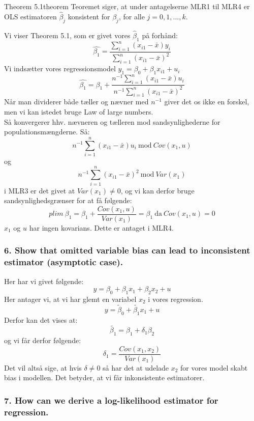 \documentclass[
  10pt,
]{article}
\begin{document}
\leavevmode
\begin{mytheo}{Theorem 5.1}{theorem}
 Teoremet siger, at under antagelserne MLR1 til MLR4 er OLS estimatoren $\hat\beta_j$ konsistent for $\beta_j$, for alle $j=0,1,...,k$.
\end{mytheo}

Vi viser Theorem 5.1, som er givet vores \(\hat\beta_1\) på forhånd:
\[\hat{\beta_1}= \frac{\sum\limits_{i=1}^n(x_{i1}-\bar{x})y_i}{\sum\limits_{i=1}^n(x_{i1}-\bar{x})^2}\]
Vi indsætter vores regressionsmodel \(y_1=\beta_0+\beta_1x_{i1}+u_i\)
\[\hat{\beta_1}= \beta_1+\frac{n^{-1}\sum\limits_{i=1}^n(x_{i1}-\bar{x})u_i}{n^{-1}\sum\limits_{i=1}^n(x_{i1}-\bar{x})^2}\]
Når man dividerer både tæller og nævner med \(n^{-1}\) giver det os ikke
en forskel, men vi kan istedet bruge Law of large numbers.\\
Så konvergerer hhv. nævneren og tælleren mod sandsynlighederne for
populationsmængderne. Så:
\[ n^{-1}\sum\limits_{i=1}^n(x_{i1}-\bar{x})u_i\ \text{mod}\ Cov(x_1,u)\]
og
\[n^{-1}\sum\limits_{i=1}^n(x_{i1}-\bar{x})^2\ \text{mod}\ Var(x_1) \] i
MLR3 er det givet at \(Var(x_1)\neq0\), og vi kan derfor bruge
sandsynlighedsgrænser for at få følgende:
\[ plim\ \beta_1 =\beta_1+\frac{Cov(x_1,u)}{Var(x_1)} = \beta_1\ \text{da}\ Cov(x_1,u)=0\]
\(x_1\) og \(u\) har ingen kovarians. Dette er antaget i MLR4. \newpage

\hypertarget{show-that-omitted-variable-bias-can-lead-to-inconsistent-estimator-asymptotic-case.}{%
\subsubsection{6. Show that omitted variable bias can lead to
inconsistent estimator (asymptotic
case).}\label{show-that-omitted-variable-bias-can-lead-to-inconsistent-estimator-asymptotic-case.}}

\leavevmode

Her har vi givet følgende: \[y=\beta_0+\beta_1x_1+\beta_2x_2+u \] Her
antager vi, at vi har glemt en variabel \(x_2\) i vores regression.
\[ y=\tilde\beta_0+\tilde{\beta_1}x_1+u\] Derfor kan det vises at:
\[\tilde{\beta_1}=\beta_1+\delta_1\beta_2\] og vi får derfor følgende:
\[\delta_1=\frac{Cov(x_1,x_2)}{Var(x_1)}\] Det vil altså sige, at hvis
\(\delta\neq0\) så har det at udelade \(x_2\) for vores model skabt bias
i modellen. Det betyder, at vi får inkonsistente estimatorer. \newpage

\hypertarget{how-can-we-derive-a-log-likelihood-estimator-for-regression.}{%
\subsubsection{7. How can we derive a log-likelihood estimator for
regression.}\label{how-can-we-derive-a-log-likelihood-estimator-for-regression.}}
\end{document}

